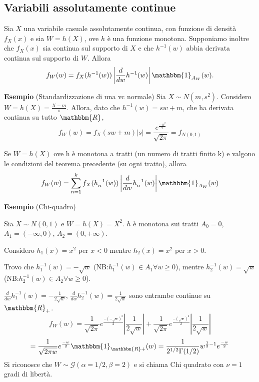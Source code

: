 \subsection{Variabili assolutamente continue}
\begin{thm}
Sia \(X\) una variabile casuale assolutamente continua, con funzione di densità \(f_X(x)\) e sia \(W=h(X)\), ove \(h\) è una funzione monotona. 
Supponiamo inoltre che \(f_X(x)\) sia continua sul supporto di \(X\) e che $h^{-1}(w)$ abbia derivata continua sul supporto di \(W\). Allora
\begin{equation}
  f_W(w)=f_X(h^{-1}(w))
  \left\lvert\frac{d}{dw}h^{-1}(w)\right\rvert\mathbbm{1}_{A_W}(w).
\end{equation}
\end{thm}
\noindent \textbf{Esempio}
(Standardizzazione di una vc normale)
Sia $X \sim N(m,s^2)$. 
Considero $W=h(X)=\frac{X-m}{s}$. 
Allora, dato che $h^{-1}(w)=sw+m$, 
che ha derivata continua su tutto $\mathbbm{R}$,  
$$f_W(w)=f_X(sw+m)|s|=\frac{e^{\frac{-w^2 }{2}}}{\sqrt{2\pi}} = f_{N(0,1)}$$
\begin{thm}
Se $W=h(X)$ ove h è monotona a tratti (un numero di tratti finito k) e valgono le condizioni del teorema precedente (su ogni tratto), allora
$$f_W(w)=\sum_{n=1}^k f_X(h_n^{-1}(w))\left|\frac{d}{dw}h_n^{-1}(w)\right|\mathbbm{1}_{A_W}(w)$$
\end{thm}
\noindent \textbf{Esempio} (Chi-quadro)

\noindent Sia $X \sim N(0,1)$ e $W=h(X)=X^2$. $h$ è monotona sui tratti $A_0={0}$, $A_1=(-\infty,0)$, $A_2=(0,+\infty)$. 

\noindent Considero $h_1(x)=x^2$ per $x<0$ mentre $h_2(x)=x^2$ per $x>0$.

\noindent Trovo che $h_1^{-1}(w)=-\sqrt{w}$ (NB:$h_1^{-1}(w)\in A_1 \forall w \geq 0$), mentre $h_2^{-1}(w)=\sqrt{w}$ (NB:$h_2^{-1}(w)\in A_2 \forall w \geq 0$).
 
\noindent $\frac{d}{dw} h_1^{-1}(w)=-\frac{1}{2\sqrt{w}}$, $\frac{d}{dw} h_2^{-1}(w)=\frac{1}{2\sqrt{w}}$ sono entrambe continue su $\mathbbm{R}_+$.
$$f_W(w)=\frac{1}{\sqrt{2\pi}}e^{\frac{-(-\sqrt{w})^2 }{2}}\left|\frac{1}{2\sqrt{w}}\right|+\frac{1}{\sqrt{2\pi}}e^{\frac{-(\sqrt{w})^2 }{2}}\left|\frac{1}{2\sqrt{w}}\right|$$ 
$$=\frac{1}{\sqrt{2\pi w}}
e^{\frac{-w}{2}}\mathbbm{1}_{\mathbbm{R}+}
(w)=\frac{1}{2^{1/2}\Gamma(1/2)}
w^{\frac{1}{2}-1}e^{\frac{-w}{2}}$$
Si riconosce che $W \sim \mathcal{G}(\alpha=1/2,\beta=2)$ e si chiama Chi quadrato con $\nu=1$ gradi di libertà.

